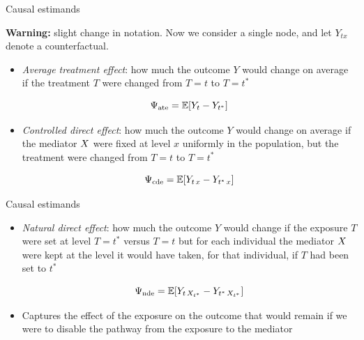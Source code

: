 \documentclass{beamer}
\theoremstyle{remark}
\begin{document}
\begin{frame}{Causal estimands}

    \textbf{Warning:} slight change in notation. Now we consider a single node, and let $Y_{t x}$ denote a counterfactual.

    \begin{itemize}
        \item \emph{Average treatment effect}: how much the outcome $Y$ would change on average if the treatment $T$ were changed from $T = t$ to $T = t^*$

              \begin{equation*}
                  \ate = \E{Y_t - Y_{t^*}}
              \end{equation*}

        \item \emph{Controlled direct effect}: how much the outcome $Y$ would change on average if the mediator $X$ were fixed at level $x$ uniformly in the population, but the treatment were changed from $T = t$ to $T = t^*$

              \begin{equation*}
                  \cde = \E{Y_{t \, x} - Y_{t^* \, x}}
              \end{equation*}

    \end{itemize}

\end{frame}

\begin{frame}{Causal estimands}

    \begin{itemize}
        \item \emph{Natural direct effect}: how much the outcome $Y$ would change if the exposure $T$ were set at level $T = t^*$ versus $T = t$ but for each individual the mediator $X$ were kept at the level it would have taken, for that individual, if $T$ had been set to $t^*$

              \begin{equation*}
                  \nde = \E{Y_{t \, \X_{t^*}} - Y_{t^* \, \X_{t^*}}}
              \end{equation*}

        \item Captures the effect of the exposure on the outcome that would remain if we were to disable the pathway from the exposure to the mediator

    \end{itemize}

\end{frame}
\end{document}
